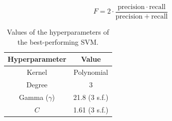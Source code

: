 \documentclass[11pt,a4paper]{article}
\begin{document}
\begin{equation}
    F = 2\cdot\frac{\mathrm{precision}\cdot \mathrm{recall}}{\mathrm{precision} + \mathrm{recall}}\label{eq:fscore}
\end{equation}

\begin{table}[ht]
    \centering
    \begin{tabular}{c|c}
        Hyperparameter & Value\\
        \hline
        Kernel & Polynomial \\
        Degree & 3 \\
        Gamma ($\gamma$) & 21.8 (3 s.f.) \\
        $C$ & 1.61 (3 s.f.)\\
    \end{tabular}
    \caption{Values of the hyperparameters of the best-performing SVM.}\label{tab:svm_hyperparameter}
\end{table}
\end{document}

